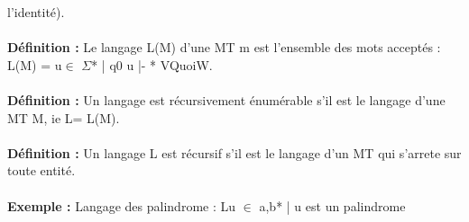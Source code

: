 \documentclass{article}
\begin{document}
l'identité).\\\\\textbf{Définition : }Le langage L(M) d'une MT m est l'ensemble des mots acceptés : L(M) = {u$\in$ $\Sigma$* | q0 u |- * VQuoiW}.\\\\\textbf{Définition : } Un langage est récursivement énumérable s'il est le langage d'une MT M, ie L= L(M).\\\\\textbf{Définition : } Un langage L est récursif s'il est le langage d'un MT qui s'arrete sur toute entité.\\\\\textbf{Exemple : } Langage des palindrome : L{u $\in$ {a,b}* | u est un palindrome} 
\end{document}

